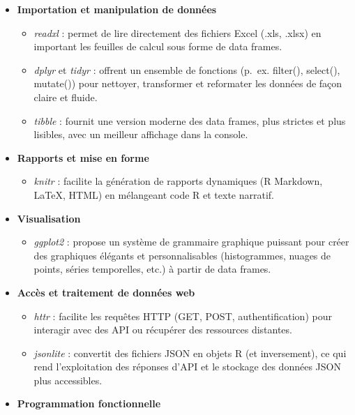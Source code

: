 \documentclass[
]{article}
\providecommand{\tightlist}{%
  \setlength{\itemsep}{0pt}\setlength{\parskip}{0pt}}
\begin{document}
\begin{itemize}
\item
  \textbf{Importation et manipulation de données}

  \begin{itemize}
  \item
    \emph{readxl} : permet de lire directement des fichiers Excel (.xls,
    .xlsx) en important les feuilles de calcul sous forme de data
    frames.
  \item
    \emph{dplyr} et \emph{tidyr} : offrent un ensemble de fonctions
    (p.~ex. filter(), select(), mutate()) pour nettoyer, transformer et
    reformater les données de façon claire et fluide.
  \item
    \emph{tibble} : fournit une version moderne des data frames, plus
    strictes et plus lisibles, avec un meilleur affichage dans la
    console.
  \end{itemize}
\item
  \textbf{Rapports et mise en forme}

  \begin{itemize}
  \tightlist
  \item
    \emph{knitr} : facilite la génération de rapports dynamiques (R
    Markdown, LaTeX, HTML) en mélangeant code R et texte narratif.
  \end{itemize}
\item
  \textbf{Visualisation}

  \begin{itemize}
  \tightlist
  \item
    \emph{ggplot2} : propose un système de grammaire graphique puissant
    pour créer des graphiques élégants et personnalisables
    (histogrammes, nuages de points, séries temporelles, etc.) à partir
    de data frames.
  \end{itemize}
\item
  \textbf{Accès et traitement de données web}

  \begin{itemize}
  \item
    \emph{httr} : facilite les requêtes HTTP (GET, POST,
    authentification) pour interagir avec des API ou récupérer des
    ressources distantes.
  \item
    \emph{jsonlite} : convertit des fichiers JSON en objets R (et
    inversement), ce qui rend l'exploitation des réponses d'API et le
    stockage des données JSON plus accessibles.
  \end{itemize}
\item
  \textbf{Programmation fonctionnelle}


\end{itemize}
\end{document}
